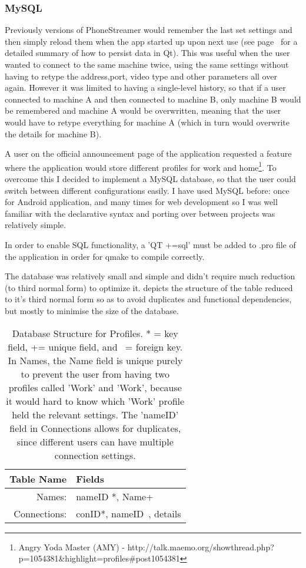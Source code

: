 \subsubsection{MySQL}
Previously versions of PhoneStreamer would remember the last set settings and then simply reload them when the app started up upon next use (see page~\pageref{QSettings} for a detailed summary of how to persist data in Qt). This was useful when the user wanted to connect to the same machine twice, using the same settings without having to retype the address,port, video type and other parameters all over again. However it was limited to having a single-level history, so that if a user connected to machine A and then connected to machine B, only machine B would be remembered and machine A would be overwritten, meaning that the user would have to retype everything for machine A (which in turn would overwrite the details for machine B).

A user on the official announcement page of the application requested a feature where the application would store different profiles for work and home\footnote{Angry Yoda Master (AMY) - http://talk.maemo.org/showthread.php?p=1054381\&highlight=profiles\#post1054381}\label{ref:amy}.
To overcome this I decided to implement a MySQL database, so that the user could switch between different configurations easily. I have used MySQL before: once for Android application, and many times for web development so I was well familiar with the declarative syntax and porting over between projects was relatively simple.

In order to enable SQL functionality, a 'QT +=sql' must be added to .pro file of the application in order for qmake to compile correctly.

The database was relatively small and simple and didn't require much reduction (to third normal form) to optimize it.  depicts the structure of the table reduced to it's third normal form so as to avoid duplicates and functional dependencies, but mostly to minimise the size of the database.
\begin{table}[H]
\centering
\begin{tabular}{| r | l | }
\hline
Table Name	&Fields\\\hline
Names:		&nameID *, Name+\\
Connections: 	&conID*, nameID~, details\\\hline
\end{tabular}
\caption{Database Structure for Profiles. * = key field, += unique field, and ~= foreign key. In Names, the Name field is unique purely to prevent the user from having two profiles called 'Work' and 'Work', because it would hard to know which 'Work' profile held the relevant settings. The 'nameID' field in Connections allows for duplicates, since different users can have multiple connection settings.}
\label{tab:profiledb}
\end{table}

